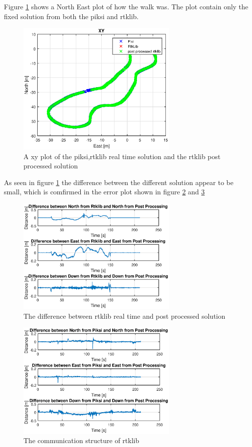 Figure \ref{figure:xywalk1} shows a North East plot of how the walk was. The plot contain only the fixed solution from both the piksi and rtklib. 
\begin{figure}[H]
	\centering
		\includegraphics[width=0.7\textwidth]{figs/plots/xy.eps}
		\caption{A xy plot of the piksi,rtklib real time solution and the rtklib post processed solution}
		\label{figure:xywalk1}
\end{figure}
As seen in figure \ref{figure:xywalk1} the difference between the different solution appear to be small, which is comfirmed in the error plot shown in figure \ref{figure:errorRTKwalk1} and \ref{figure:errorPiksiwalk1}
\begin{figure}[H]
	\centering
		\includegraphics[width=0.7\textwidth]{figs/plots/ertkpost.eps}
		\caption{The difference between rtklib real time and post processed solution}
		\label{figure:errorRTKwalk1}
\end{figure}
\begin{figure}[H]
	\centering
		\includegraphics[width=0.7\textwidth]{figs/plots/epiksiport.eps}
		\caption{The communication structure of rtklib}
		\label{figure:errorPiksiwalk1}
\end{figure}
